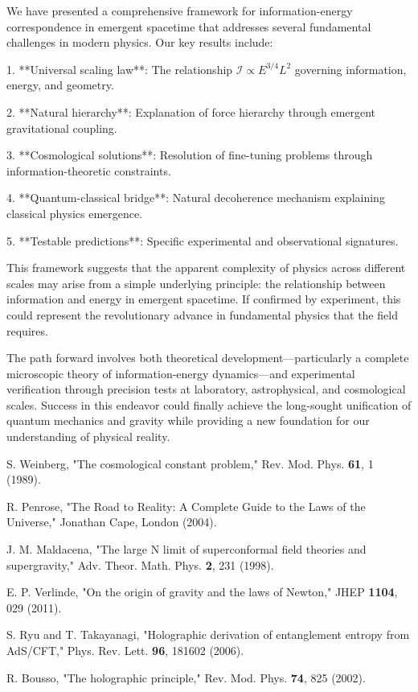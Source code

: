 \documentclass[11pt,a4paper]{article}
\begin{document}
We have presented a comprehensive framework for information-energy correspondence in emergent spacetime that addresses several fundamental challenges in modern physics. Our key results include:

1. **Universal scaling law**: The relationship $\mathcal{I} \propto E^{3/4} L^2$ governing information, energy, and geometry.

2. **Natural hierarchy**: Explanation of force hierarchy through emergent gravitational coupling.

3. **Cosmological solutions**: Resolution of fine-tuning problems through information-theoretic constraints.

4. **Quantum-classical bridge**: Natural decoherence mechanism explaining classical physics emergence.

5. **Testable predictions**: Specific experimental and observational signatures.

This framework suggests that the apparent complexity of physics across different scales may arise from a simple underlying principle: the relationship between information and energy in emergent spacetime. If confirmed by experiment, this could represent the revolutionary advance in fundamental physics that the field requires.

The path forward involves both theoretical development—particularly a complete microscopic theory of information-energy dynamics—and experimental verification through precision tests at laboratory, astrophysical, and cosmological scales. Success in this endeavor could finally achieve the long-sought unification of quantum mechanics and gravity while providing a new foundation for our understanding of physical reality.

\begin{thebibliography}{99}
 S. Weinberg, "The cosmological constant problem," Rev. Mod. Phys. \textbf{61}, 1 (1989).

 R. Penrose, "The Road to Reality: A Complete Guide to the Laws of the Universe," Jonathan Cape, London (2004).

 J. M. Maldacena, "The large N limit of superconformal field theories and supergravity," Adv. Theor. Math. Phys. \textbf{2}, 231 (1998).

 E. P. Verlinde, "On the origin of gravity and the laws of Newton," JHEP \textbf{1104}, 029 (2011).

 S. Ryu and T. Takayanagi, "Holographic derivation of entanglement entropy from AdS/CFT," Phys. Rev. Lett. \textbf{96}, 181602 (2006).

 R. Bousso, "The holographic principle," Rev. Mod. Phys. \textbf{74}, 825 (2002).

\end{thebibliography}
\end{document}
